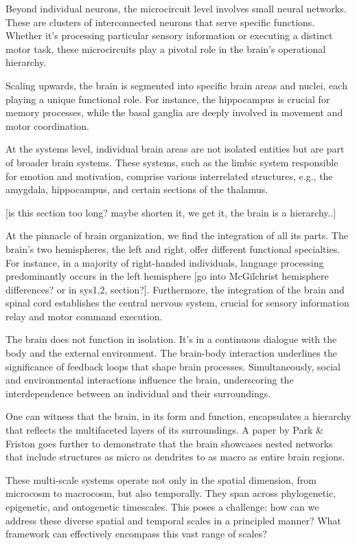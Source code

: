 Beyond individual neurons, the microcircuit level involves small neural networks. These are clusters of interconnected neurons that serve specific functions. Whether it's processing particular sensory information or executing a distinct motor task, these microcircuits play a pivotal role in the brain's operational hierarchy.

Scaling upwards, the brain is segmented into specific brain areas and nuclei, each playing a unique functional role. For instance, the hippocampus is crucial for memory processes, while the basal ganglia are deeply involved in movement and motor coordination.

At the systems level, individual brain areas are not isolated entities but are part of broader brain systems. These systems, such as the limbic system responsible for emotion and motivation, comprise various interrelated structures, e.g., the amygdala, hippocampus, and certain sections of the thalamus.

[is this section too long? maybe shorten it, we get it, the brain is a hierarchy..]
 

At the pinnacle of brain organization, we find the integration of all its parts. The brain's two hemispheres, the left and right, offer different functional specialties. For instance, in a majority of right-handed individuals, language processing predominantly occurs in the left hemisphere [go into McGilchrist hemisphere differences? or in sys1,2, section?]. Furthermore, the integration of the brain and spinal cord establishes the central nervous system, crucial for sensory information relay and motor command execution.

The brain does not function in isolation. It's in a continuous dialogue with the body and the external environment. The brain-body interaction underlines the significance of feedback loops that shape brain processes. Simultaneously, social and environmental interactions influence the brain, underscoring the interdependence between an individual and their surroundings.

\cite{Park_Friston_2013}
One can witness that the brain, in its form and function, encapsulates a hierarchy that reflects the multifaceted layers of its surroundings. A paper by Park \& Friston goes further to demonstrate that the brain showcases nested networks that include structures as micro as dendrites to as macro as entire brain regions.

These multi-scale systems operate not only in the spatial dimension, from microcosm to macrocosm, but also temporally. They span across phylogenetic, epigenetic, and ontogenetic timescales. This poses a challenge: how can we address these diverse spatial and temporal scales in a principled manner? What framework can effectively encompass this vast range of scales?

